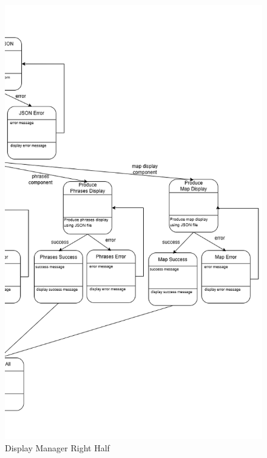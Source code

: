 \begin{figure}[H]
	\centering
	\includegraphics[width=\textwidth, height=\textheight, keepaspectratio]{Section2/images/display_manager_state_diagram_right_half.png}
	\caption{Display Manager Right Half}
	\label{DisplayManager}
\end{figure}